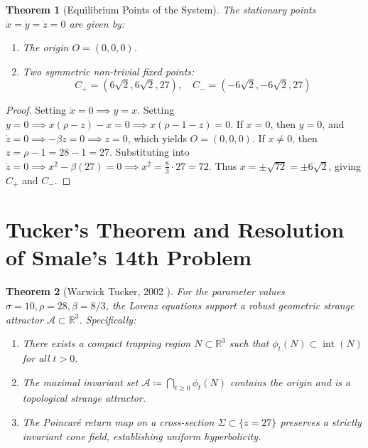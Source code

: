 \documentclass[11pt,a4paper]{article}
\newtheorem{theorem}{Theorem}[section]
\theoremstyle{definition}
\begin{document}
\begin{theorem}[Equilibrium Points of the System]\label{thm:lorenz_equilibria}
The stationary points $\dot{x} = \dot{y} = \dot{z} = 0$ are given by:
\begin{enumerate}
    \item The origin $O = (0, 0, 0)$.
    \item Two symmetric non-trivial fixed points:
    \begin{equation}\label{eq:c_pm}
    C_+ = \left( 6\sqrt{2}, 6\sqrt{2}, 27 \right), \quad C_- = \left( -6\sqrt{2}, -6\sqrt{2}, 27 \right)
    \end{equation}
\end{enumerate}
\end{theorem}

\begin{proof}
Setting $\dot{x} = 0 \implies y = x$.
Setting $\dot{y} = 0 \implies x(\rho - z) - x = 0 \implies x(\rho - 1 - z) = 0$.
If $x = 0$, then $y = 0$, and $\dot{z} = 0 \implies -\beta z = 0 \implies z = 0$, which yields $O = (0,0,0)$.
If $x \ne 0$, then $z = \rho - 1 = 28 - 1 = 27$.
Substituting into $\dot{z} = 0 \implies x^2 - \beta(27) = 0 \implies x^2 = \frac{8}{3} \cdot 27 = 72$.
Thus $x = \pm \sqrt{72} = \pm 6\sqrt{2}$, giving $C_+$ and $C_-$.
\end{proof}

\section{Tucker's Theorem and Resolution of Smale's 14th Problem}

\begin{theorem}[Warwick Tucker, 2002 \cite{tucker1999, tucker2002}]\label{thm:tucker_main}
For the parameter values $\sigma = 10, \rho = 28, \beta = 8/3$, the Lorenz equations support a robust geometric strange attractor $\mathcal{A} \subset \mathbb{R}^3$.
Specifically:
\begin{enumerate}
    \item There exists a compact trapping region $N \subset \mathbb{R}^3$ such that $\phi_t(N) \subset \operatorname{int}(N)$ for all $t > 0$.
    \item The maximal invariant set $\mathcal{A} \coloneqq \bigcap_{t \ge 0} \phi_t(N)$ contains the origin and is a topological strange attractor.
    \item The Poincar\'e return map on a cross-section $\Sigma \subset \{z = 27\}$ preserves a strictly invariant cone field, establishing uniform hyperbolicity.
\end{enumerate}
\end{theorem}
\end{document}
